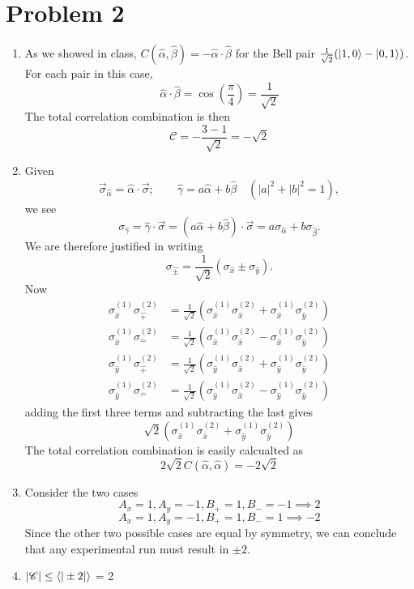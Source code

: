 \documentclass[12pt]{article}
\newcommand{\magsq}[1]{\big|#1\big|^2}
\begin{document}
\section*{Problem 2}
\begin{enumerate}[label=(\alph*)]
    \item As we showed in class, $C(\hat{\alpha},\hat{\beta}) = -\hat{\alpha}\cdot\hat{\beta}$ for the Bell pair $\frac{1}{\sqrt{2}}(\ket{1, 0} - \ket{0, 1})$. For each pair in this case,
    \[ \hat{\alpha}\cdot\hat{\beta} = \cos(\frac{\pi}{4}) = \frac{1}{\sqrt{2}} \]
    The total correlation combination is then
    \[ \mathscr{C} = -\frac{3-1}{\sqrt{2}} = -\sqrt{2} \]

    \item Given
    \[ \vec{\sigma}_{\hat{\alpha}} = \hat{\alpha}\cdot\vec{\sigma}; \qquad \hat{\gamma} = a\hat{\alpha} + b\hat{\beta} \quad (\magsq{a} + \magsq{b} = 1), \]
    we see
    \[ \sigma_{\hat{\gamma}} = \hat{\gamma}\cdot\vec{\sigma} = \left(a\hat{\alpha} + b\hat{\beta}\right)\cdot\vec{\sigma} = a\sigma_{\hat{\alpha}} + b\sigma_{\hat{\beta}}. \]
    We are therefore justified in writing
    \[ \sigma_{\hat{\pm}} = \frac{1}{\sqrt{2}}\left(\sigma_{\hat{x}} \pm \sigma_{\hat{y}}\right). \]
    Now
    \begin{align*}
        \sigma_{\hat{x}}^{(1)}\sigma_{\hat{+}}^{(2)} &= \frac{1}{\sqrt{2}}\left(\sigma_{\hat{x}}^{(1)}\sigma_{\hat{x}}^{(2)} + \sigma_{\hat{x}}^{(1)}\sigma_{\hat{y}}^{(2)} \right) \\
        \sigma_{\hat{x}}^{(1)}\sigma_{\hat{-}}^{(2)} &= \frac{1}{\sqrt{2}}\left(\sigma_{\hat{x}}^{(1)}\sigma_{\hat{x}}^{(2)} - \sigma_{\hat{x}}^{(1)}\sigma_{\hat{y}}^{(2)} \right) \\
        \sigma_{\hat{y}}^{(1)}\sigma_{\hat{+}}^{(2)} &= \frac{1}{\sqrt{2}}\left(\sigma_{\hat{y}}^{(1)}\sigma_{\hat{x}}^{(2)} + \sigma_{\hat{y}}^{(1)}\sigma_{\hat{y}}^{(2)} \right) \\
        \sigma_{\hat{y}}^{(1)}\sigma_{\hat{-}}^{(2)} &= \frac{1}{\sqrt{2}}\left(\sigma_{\hat{y}}^{(1)}\sigma_{\hat{x}}^{(2)} - \sigma_{\hat{y}}^{(1)}\sigma_{\hat{y}}^{(2)} \right)
    \end{align*}
    adding the first three terms and subtracting the last gives
    \[ \sqrt{2}\left(\sigma_{\hat{x}}^{(1)}\sigma_{\hat{x}}^{(2)} + \sigma_{\hat{y}}^{(1)}\sigma_{\hat{y}}^{(2)} \right) \]
    The total correlation combination is easily calcualted as
    \[ 2\sqrt{2}C(\hat{\alpha}, \hat{\alpha}) = -2\sqrt{2} \]

    \item Consider the two cases
    \[ A_x = 1, A_y = -1, B_+ = 1, B_- = -1 \implies 2 \]
    \[ A_x = 1, A_y = -1, B_+ = 1, B_- = 1 \implies -2 \]
    Since the other two possible cases are equal by symmetry, we can conclude that any experimental run must result in $\pm 2$. 

    \item $|\mathscr{C}| \leq \ev{|\pm 2|}$ = 2
\end{enumerate}
\end{document}
